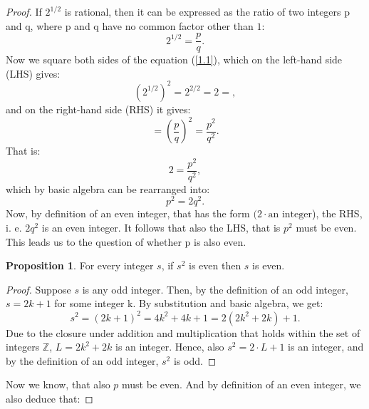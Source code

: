 \documentclass[11pt]{amsart}
\theoremstyle{definition}
\newtheorem{proposition}{Proposition}
\begin{document}
\begin{proof}
    If \(2^{1/2}\) is rational, then it can be expressed as the ratio of two integers p and q, where p and q have no common factor other than \(1\):
    \begin{equation}\label{1.1}
        2^{1/2} = \frac{p}{q}.
    \end{equation}
    Now we square both sides of the equation (\ref{1.1}), which on the left-hand side (LHS) gives:
    \begin{equation}\label{1.2}
        \left(2^{1/2}\right)^{2} = 2^{2/2} = 2 =,
    \end{equation}
    and on the right-hand side (RHS) it gives:
    \begin{equation}\label{1.3}
        = \left(\frac{p}{q}\right)^{2} = \frac{p^2}{q^2}.
    \end{equation}
    That is:
    \begin{equation}\label{1.4}
        2 = \frac{p^2}{q^2},
    \end{equation}
    which by basic algebra can be rearranged into:
    \begin{equation}\label{1.5}
        p^{2} = 2q^{2}.
    \end{equation}
    Now, by definition of an even integer, that has the form \((2 \cdot \text{an integer}\)), the RHS, i. e. \(2q^{2}\) is an even integer. It follows that also the LHS, that is \(p^{2}\) must be even. This leads us to the question of whether p is also even.
    \begin{proposition}\label{2.1}
        For every integer \(s\), if \(s^{2}\) is even then \(s\) is even.
    \end{proposition}
    \begin{proof}\renewcommand{\qedsymbol}{}
        Suppose \(s\) is any odd integer. Then, by the definition of an odd integer, \(s = 2k + 1\) for some integer k. By substitution and basic algebra, we get:
        \begin{equation}
            s^{2} = (2k + 1)^{2} = 4k^{2} + 4k + 1 = 2(2k^{2} + 2k) + 1.
        \end{equation}
        Due to the closure under addition and multiplication that holds within the set of integers \(\mathbb{Z}\), \(L = 2k^{2} + 2k\) is an integer. Hence, also \(s^{2} = 2 \cdot L + 1\) is an integer, and by the definition of an odd integer, \(s^{2}\) is odd.
    \end{proof}
    Now we know, that also \(p\) must be even. And by definition of an even integer, we also deduce that:

\end{proof}
\end{document}
